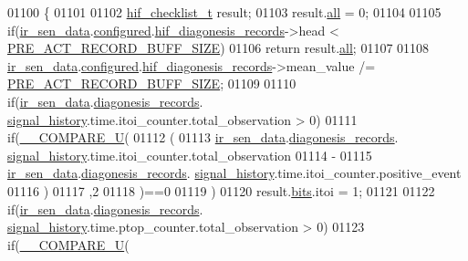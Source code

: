 \begin{DoxyCode}
01100                             \{
01101 
01102     \hyperlink{a00021_d7/d9f/a00454}{hif\_checklist\_t} result;
01103     result.\hyperlink{a00021_a2625a533c46821f49caaf4dcc77316b1}{all} = 0;
01104 
01105     \textcolor{keywordflow}{if}(\hyperlink{a00045_a73dfacb46242746440accc76c7ef710d}{ir\_sen\_data}.\hyperlink{a00023_a94b2d1f6ea4ab334c74d24984dd27843}{configured}.\hyperlink{a00021_ae18294f7499d9fcb5ec796a1816b8cd8}{hif\_diagonesis\_records}->head < 
      \hyperlink{a00022_a18dcecc16ded13fa622e0913e73442e6}{PRE\_ACT\_RECORD\_BUFF\_SIZE})
01106         \textcolor{keywordflow}{return} result.\hyperlink{a00021_a2625a533c46821f49caaf4dcc77316b1}{all};
01107 
01108     \hyperlink{a00045_a73dfacb46242746440accc76c7ef710d}{ir\_sen\_data}.\hyperlink{a00023_a94b2d1f6ea4ab334c74d24984dd27843}{configured}.\hyperlink{a00021_ae18294f7499d9fcb5ec796a1816b8cd8}{hif\_diagonesis\_records}->mean\_value /=
      \hyperlink{a00022_a18dcecc16ded13fa622e0913e73442e6}{PRE\_ACT\_RECORD\_BUFF\_SIZE};
01109 
01110     \textcolor{keywordflow}{if}(\hyperlink{a00045_a73dfacb46242746440accc76c7ef710d}{ir\_sen\_data}.\hyperlink{a00023_a7ae905b560513ad201e58c2f63375030}{diagonesis\_records}.
      \hyperlink{a00017_affb63906d23cb1cb7787d61eaaedfb60}{signal\_history}.time.itoi\_counter.total\_observation > 0)
01111     \textcolor{keywordflow}{if}(\hyperlink{a00021_a2ec57e7d50ba444ecb9e5c8b717d832d}{\_\_COMPARE\_U}(
01112             (
01113             \hyperlink{a00045_a73dfacb46242746440accc76c7ef710d}{ir\_sen\_data}.\hyperlink{a00023_a7ae905b560513ad201e58c2f63375030}{diagonesis\_records}.
      \hyperlink{a00017_affb63906d23cb1cb7787d61eaaedfb60}{signal\_history}.time.itoi\_counter.total\_observation
01114             -
01115             \hyperlink{a00045_a73dfacb46242746440accc76c7ef710d}{ir\_sen\_data}.\hyperlink{a00023_a7ae905b560513ad201e58c2f63375030}{diagonesis\_records}.
      \hyperlink{a00017_affb63906d23cb1cb7787d61eaaedfb60}{signal\_history}.time.itoi\_counter.positive\_event
01116             )
01117             ,2
01118             )==0
01119            )
01120         result.\hyperlink{a00021_a4c757443cba2deaf7051fd53f385a73e}{bits}.itoi = 1;
01121 
01122     \textcolor{keywordflow}{if}(\hyperlink{a00045_a73dfacb46242746440accc76c7ef710d}{ir\_sen\_data}.\hyperlink{a00023_a7ae905b560513ad201e58c2f63375030}{diagonesis\_records}.
      \hyperlink{a00017_affb63906d23cb1cb7787d61eaaedfb60}{signal\_history}.time.ptop\_counter.total\_observation > 0)
01123     \textcolor{keywordflow}{if}(\hyperlink{a00021_a2ec57e7d50ba444ecb9e5c8b717d832d}{\_\_COMPARE\_U}(

\end{DoxyCode}
